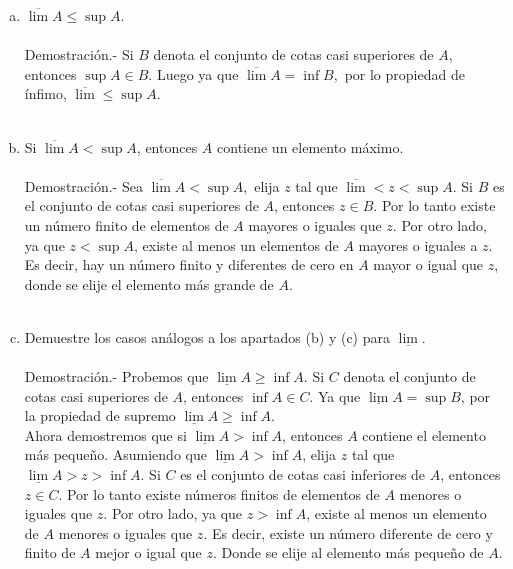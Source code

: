 \begin{enumerate}[\bfseries 1.]
\begin{enumerate}[(a)]
	    \item $\overline{\lim} A \leq \sup A$.\\\\
		Demostración.-\; Si $B$ denota el conjunto de cotas casi superiores de $A$, entonces $\sup A \in B$. Luego ya que $\overline{\lim} A = \inf B,$ por lo propiedad de ínfimo, $\overline{\lim} \leq \sup A$.\\\\

	    \item Si $\overline{\lim} A < \sup A$, entonces $A$ contiene un elemento máximo.\\\\
		Demostración.-\; Sea $\overline{\lim} A < \sup A,$ elija $z$ tal que $\overline{\lim} < z < \sup A$. Si $B$ es el conjunto de cotas casi superiores de $A$, entonces $z\in B.$ Por lo tanto existe un número finito de elementos de $A$ mayores o iguales que $z$. Por otro lado, ya que $z<\sup A$, existe al menos un elementos de $A$ mayores o iguales a $z$. Es decir, hay un número finito y diferentes de cero en $A$ mayor o igual que $z$, donde se elije el elemento más grande de $A$.\\\\

	    \item Demuestre los casos análogos a los apartados (b) y (c) para $\underline{\lim}$.\\\\
		Demostración.-\; Probemos que $\underline{\lim} A \geq \inf A.$ Si $C$ denota el conjunto de cotas casi superiores de $A$, entonces $\inf A \in C$. Ya que $\underline{\lim} A = \sup B$, por la propiedad de supremo $\underline{\lim} A \geq \inf A$. \\
		Ahora demostremos que si $\underline{\lim} A  > \inf A$, entonces $A$ contiene el elemento más pequeño. Asumiendo que $\underline{\lim} A > \inf A$, elija $z$ tal que $\underline{\lim} A > z > \inf A$. Si $C$ es el conjunto de cotas casi inferiores de $A$, entonces $z\in C$. Por lo tanto existe números finitos de elementos de $A$ menores o iguales que $z$. Por otro lado, ya que $z>\inf A$, existe al menos un elemento de $A$ menores o iguales que $z$. Es decir, existe un número diferente de cero y finito de $A$ mejor o igual que $z$. Donde se elije al elemento más pequeño de $A$.\\\\  


\end{enumerate}
\end{enumerate}
